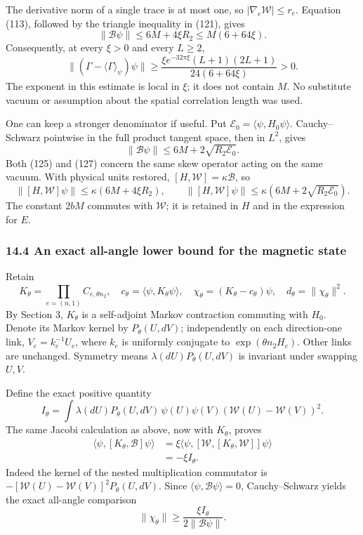 \documentclass[
  11pt,
]{article}
\begin{document}
The derivative norm of a single trace is at most one, so
\(|\nabla_e\mathcal W|\le r_e\). Equation (113), followed by the
triangle inequality in (121), gives \[
 \lVert\mathscr B\psi\rVert
 \le6M+4\xi R_2\le M(6+64\xi).
 \tag{125}
\] Consequently, at every \(\xi>0\) and every \(L\ge2\), \[
 \boxed{\quad
 \lVert(\Gamma-\langle\Gamma\rangle_\psi)\psi\rVert
 \ge
 \frac{\xi e^{-32\pi\xi}(L+1)(2L+1)}
      {24(6+64\xi)} >0.
 \quad}
 \tag{126}
\] The exponent in this estimate is local in \(\xi\); it does not
contain \(M\). No substitute vacuum or assumption about the spatial
correlation length was used.

One can keep a stronger denominator if useful. Put
\(\mathcal E_0=\langle\psi,H_0\psi\rangle\). Cauchy--Schwarz pointwise
in the full product tangent space, then in \(L^2\), gives \[
 \lVert\mathscr B\psi\rVert
 \le6M+2\sqrt{R_2\mathcal E_0}.
 \tag{127}
\] Both (125) and (127) concern the same skew operator acting on the
same vacuum. With physical units restored,
\([H,\mathcal W]=\kappa\mathscr B\), so \[
 \lVert[H,\mathcal W]\psi\rVert
 \le\kappa(6M+4\xi R_2),
 \qquad
 \lVert[H,\mathcal W]\psi\rVert
 \le\kappa(6M+2\sqrt{R_2\mathcal E_0}).
 \tag{128}
\] The constant \(2bM\) commutes with \(\mathcal W\); it is retained in
\(H\) and in the expression for \(E\).

\subsubsection{14.4 An exact all-angle lower bound for the magnetic
state}\label{an-exact-all-angle-lower-bound-for-the-magnetic-state}

Retain \[
 K_\theta=\prod_{e=(n,1)}C_{e,\theta n_2},\quad
 c_\theta=\langle\psi,K_\theta\psi\rangle,
 \quad\chi_\theta=(K_\theta-c_\theta)\psi,
 \quad d_\theta=\lVert\chi_\theta\rVert^2.
\] By Section 3, \(K_\theta\) is a self-adjoint Markov contraction
commuting with \(H_0\). Denote its Markov kernel by \(P_\theta(U,dV)\);
independently on each direction-one link, \(V_e=k_e^{-1}U_e\), where
\(k_e\) is uniformly conjugate to \(\exp(\theta n_2H_c)\). Other links
are unchanged. Symmetry means \(\lambda(dU)P_\theta(U,dV)\) is invariant
under swapping \(U,V\).

Define the exact positive quantity \[
 I_\theta=\int\lambda(dU)P_\theta(U,dV)\,
       \psi(U)\psi(V)
       (\mathcal W(U)-\mathcal W(V))^2.
 \tag{129}
\] The same Jacobi calculation as above, now with \(K_\theta\), proves
\[
 \begin{split}
 \langle\psi,[K_\theta,\mathscr B]\psi\rangle
 &=\xi\langle\psi,[\mathcal W,[K_\theta,\mathcal W]]\psi\rangle\\
 &=-\xi I_\theta.
 \end{split}
 \tag{130}
\] Indeed the kernel of the nested multiplication commutator is
\(-[\mathcal W(U)-\mathcal W(V)]^2P_\theta(U,dV)\). Since
\(\langle\psi,\mathscr B\psi\rangle=0\), Cauchy--Schwarz yields the
exact all-angle comparison \[
 \boxed{\qquad
 \lVert\chi_\theta\rVert\ge
 \frac{\xi I_\theta}{2\lVert\mathscr B\psi\rVert}.
 \qquad}
 \tag{131}
\]
\end{document}
